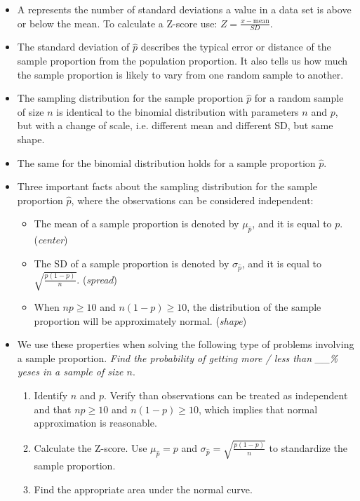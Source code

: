 \begin{itemize}
\item A  represents the number of standard deviations a value in a data set is above or below the mean.  To calculate a \mbox{Z-score} use: $Z = \frac{x-\text{mean}}{SD}$.  

\item The standard deviation of $\hat{p}$ describes the typical error or distance of the sample proportion from the population proportion.  It also tells us how much the sample proportion is likely to vary from one random sample to another.  


\item The sampling distribution for the sample proportion $\hat{p}$ for a random sample of size $n$ is identical to the binomial distribution with parameters $n$ and $p$, but with a change of scale, i.e. different mean and different SD, but same shape.

\item The same  for the binomial distribution holds for a sample proportion $\hat{p}$.

\item Three important facts about the sampling distribution for the sample proportion $\hat{p}$, where the observations can be considered independent:
\begin{itemize}\vspace{-1mm}
\item The mean of a sample proportion is denoted by $\mu_{\hat{p}}$, and it is equal to $p$.  (\textit{center})
\item The SD of a sample proportion is denoted by $\sigma_{\hat{p}}$, and it is equal to $\sqrt{\frac{p(1-p)}{n}}$.  (\textit{spread})
\item When $np\ge 10$ and $n(1-p)\ge 10$, the distribution of the sample proportion will be approximately normal.   (\textit{shape})
\end{itemize}

\item We use these properties when solving the following type of  problems involving a sample proportion.  
\emph{Find the probability of getting more / less than \_\_\% yeses in a sample of size $n$}.
\begin{enumerate}\vspace{-1mm}
\setlength{\itemsep}{0mm}
\item Identify $n$ and $p$. Verify than observations can be treated as independent and that $np\ge 10$ and $n(1-p)\ge 10$, which implies that normal approximation is reasonable. 
\item Calculate the Z-score.  Use $\mu_{\hat{p}} = p$ and $\sigma_{\hat{p}} = \sqrt{\frac{p(1-p)}{n}}$ to standardize the sample proportion.  
\item Find the appropriate area under the normal curve.  \end{enumerate}

\end{itemize}

